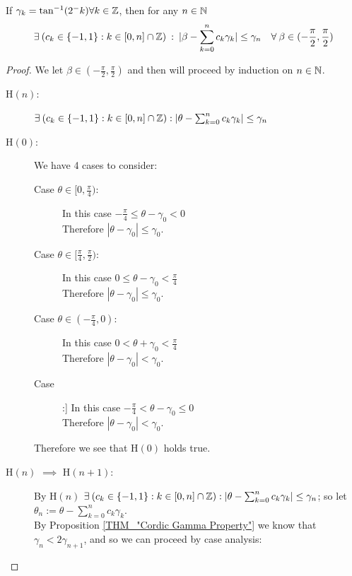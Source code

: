 {%
\begin{Cordic Accuracy}
\label{THM_"Cordic Accuracy"}
If \(\gamma_k = \tan^{-1}(2^-k) \forall k \in \mathbb{Z}\), then for any \(n \in \mathbb{N}\) 
\[\exists \: (c_k\in \{-1,1\} : k \in [0,n] \cap \mathbb{Z}) \: : \: |\beta - \sum_{k=0}^nc_k\gamma_k| \le \gamma_n \quad \forall \: \beta \in (-\frac{\pi}{2}, \frac{\pi}{2})\]
\end{Cordic Accuracy}
\begin{proof}
We let \(\beta \in (-\frac{\pi}{2}, \frac{\pi}{2})\) and then will proceed by induction on \(n \in \mathbb{N}\).
\begin{description}
\item[\textrm{H\((n)\)}:] 
	\(\exists\: (c_k \in\{-1, 1\} : k \in [0, n] \cap \mathbb{Z}) : |\theta - \sum_{k=0}^nc_k\gamma_k| \le \gamma_n\)\\
\item[\textrm{H\((0)\)}:] 
	We have 4 cases to consider:\\
	\begin{description}
	\item[Case \(\theta \in [0, \frac{\pi}{4})\):]
		In this case \(-\frac{\pi}{4} \le \theta - \gamma_0 < 0\)\\
		Therefore \(|\theta - \gamma_0| \le \gamma_0\).
	\item[Case \(\theta \in [\frac{\pi}{4}, \frac{\pi}{2})\):]
		In this case \(0 \le \theta - \gamma_0 < \frac{\pi}{4}\)\\
		Therefore \(|\theta - \gamma_0| \le \gamma_0\).
	\item[Case \(\theta \in (-\frac{\pi}{4}, 0)\):]
		In this case \(0 < \theta + \gamma_0 < \frac{\pi}{4}\)\\
		Therefore \(|\theta - \gamma_0| < \gamma_0\).
	\item[Case \(\theta \in (-\frac{\pi}{2}, -\frac{\pi}{4}]\):]
		In this case \(-\frac{\pi}{4} < \theta - \gamma_0 \le 0\)\\
		Therefore \(|\theta - \gamma_0| < \gamma_0\).
	\end{description}
	Therefore we see that \textrm{H\((0)\)} holds true.
\item[\textrm{H\((n)\) \(\implies\) H\((n+1)\)}:]\hfill\break
	By \textrm{H\((n)\)} \(\exists\: (c_k \in \{-1,1\} : k \in [0,n] \cap \mathbb{Z}) : |\theta - \sum_{k=0}^nc_k\gamma_k| \le \gamma_n\); so let \(\theta_n := \theta - \sum_{k=0}^nc_k\gamma_k\).\\
	By Proposition \ref{THM_"Cordic Gamma Property"} we know that \(\gamma_n < 2\gamma_{n+1}\), and so we can proceed by case analysis:
	\begin{description}

\end{description}
\end{description}
\end{proof}}
